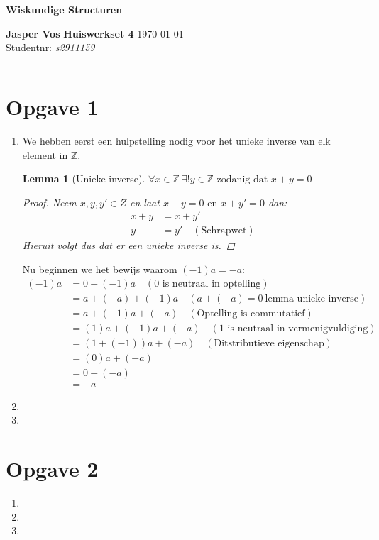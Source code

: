 \documentclass{article}
\begin{document}
{\Large \textbf{Wiskundige Structuren}}

\bigskip

\textbf{Jasper Vos} \hfill \textbf{Huiswerkset 4} \hfill \today \\
Studentnr: \emph{s2911159}

\rule{\textwidth}{2pt}

\bigskip

\newtheorem{lemma}{Lemma}

\newcommand{\N}{\mathbb{N}}
\newcommand{\f}[2]{\frac{#1}{#2}}
\newcommand{\tx}[1]{\text{#1}}
\newcommand{\cn}[1]{\cancel{#1}}
\newcommand{\Z}{\mathbb{Z}}
\newcommand{\R}{\mathbb{R}}
\newcommand{\Rho}{\mathcal{P}}
\newcommand{\en}{\tx{ en }}
\newcommand{\of}{\tx{ of }}
\newcommand{\geldt}{\tx{ geldt }}
\newcommand{\dan}{\tx{ dan }}
\newcommand{\als}{\tx{ als }}
\newcommand{\zdd}{\tx{ zodanig dat }}

\section*{Opgave 1}
\begin{enumerate}[label=\alph*)]
    \item We hebben eerst een hulpstelling nodig voor het unieke inverse van elk element in $\Z$.
    \begin{lemma}[Unieke inverse]
        \(\forall x \in \Z \ \exists ! y \in \Z \zdd x + y = 0 \)
        \begin{proof}
            Neem \(x, y, y' \in Z \) en laat \( x + y = 0 \en x + y' = 0\) dan:
            \begin{align*}
                x + y &= x + y' \\
                y &= y' \quad (\tx{Schrapwet})
            \end{align*}
            Hieruit volgt dus dat er een unieke inverse is.
        \end{proof}
    \end{lemma}
    Nu beginnen we het bewijs waarom $(-1)a = -a$:
    \begin{align*}
        (-1)a &= 0 + (-1)a \quad (0 \tx{ is neutraal in optelling})\\
        &= a + (-a) + (-1)a \quad (a + (-a) = 0 \ \tx{lemma unieke inverse})\\ 
        &= a + (-1)a + (-a) \quad (\tx{Optelling is commutatief}) \\
        &= (1)a + (-1)a + (-a) \quad (1 \tx{ is neutraal in vermenigvuldiging}) \\
        &= (1 + (-1))a + (-a) \quad (\tx{Ditstributieve eigenschap}) \\
        &= (0)a + (-a) \\
        &= 0 + (-a) \\
        &= -a
    \end{align*}

    \item
    \item
\end{enumerate}

\section*{Opgave 2}
\begin{enumerate}[label=\alph*)]
    \item 
    \item
    \item
\end{enumerate}
\end{document}
